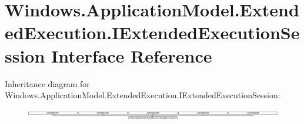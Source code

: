 \hypertarget{interface_windows_1_1_application_model_1_1_extended_execution_1_1_i_extended_execution_session}{}\section{Windows.\+Application\+Model.\+Extended\+Execution.\+I\+Extended\+Execution\+Session Interface Reference}
\label{interface_windows_1_1_application_model_1_1_extended_execution_1_1_i_extended_execution_session}
Inheritance diagram for Windows.\+Application\+Model.\+Extended\+Execution.\+I\+Extended\+Execution\+Session\+:\begin{figure}[H]
\begin{center}
\leavevmode
\includegraphics[height=0.507937cm]{interface_windows_1_1_application_model_1_1_extended_execution_1_1_i_extended_execution_session}
\end{center}
\end{figure}
